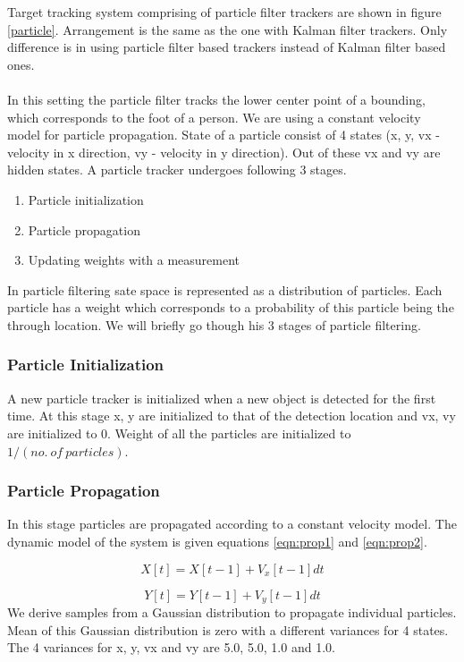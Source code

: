 \documentclass[12pt,a4paper]{report}
\begin{document}
Target tracking system comprising of particle filter trackers are shown in figure \ref{particle}. Arrangement is the same as the one with Kalman filter trackers. Only difference is in using particle filter based trackers instead of Kalman filter based ones.\\\\
In this setting the particle filter tracks the lower center point of a bounding, which corresponds to the foot of a person. We are using a constant velocity model for particle propagation.  State of a particle consist of 4 states (x, y, vx - velocity in x direction, vy - velocity in y direction). Out of these vx and vy are hidden states. A particle tracker undergoes following 3 stages.
\begin{enumerate}
\item Particle initialization
\item Particle propagation
\item Updating weights with a measurement
\end{enumerate}
In particle filtering sate space is represented as a distribution of particles. Each particle has a weight which corresponds to a probability of this particle being the through location. We will briefly go though his 3 stages of particle filtering.

\subsubsection{Particle Initialization}

A new particle tracker is initialized when a new object is detected for the first time. At this stage x, y are initialized to that of the detection location and vx, vy are initialized to 0. Weight of all the particles are initialized to $1/(no.\ of\ particles)$.

\subsubsection{Particle Propagation}

In this stage particles are propagated according to a constant velocity model. The dynamic model of the system is given equations \ref{eqn:prop1} and \ref{eqn:prop2}.

\begin{equation}
\label{eqn:prop1}
X[t] = X[t-1] + V_x[t-1] dt
\end{equation}

\begin{equation}
\label{eqn:prop2}
Y[t] = Y[t-1] + V_y[t-1] dt
\end{equation}
We derive samples from a Gaussian distribution to propagate individual particles. Mean of this Gaussian distribution is zero with a different variances for 4 states. The 4 variances for x, y, vx and vy are 5.0, 5.0, 1.0 and 1.0.
\end{document}
